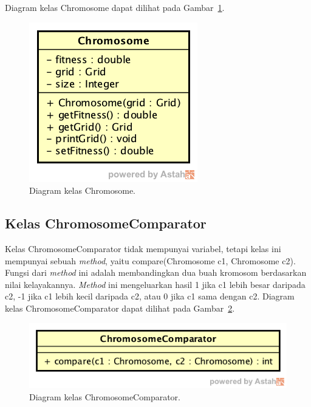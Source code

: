 Diagram kelas Chromosome dapat dilihat pada Gambar~\ref{fig:diagramkelaschromosome}.

\begin{figure}
\centering
\captionsetup{justification=centering}
\includegraphics[scale=0.5]{Gambar/Perancangan/DiagramKelasChromosome.png}
\caption[Diagram kelas Chromosome.]{Diagram kelas Chromosome.}
\label{fig:diagramkelaschromosome}
\end{figure}

\subsection{Kelas ChromosomeComparator}
\label{sec:kelaschromosomecomparator}

Kelas ChromosomeComparator tidak mempunyai variabel, tetapi kelas ini mempunyai sebuah \textit{method}, yaitu compare(Chromosome c1, Chromosome c2). Fungsi dari \textit{method} ini adalah membandingkan dua buah kromosom berdasarkan nilai kelayakannya. \textit{Method} ini mengeluarkan hasil 1 jika c1 lebih besar daripada c2, -1 jika c1 lebih kecil daripada c2, atau 0 jika c1 sama dengan c2. Diagram kelas ChromosomeComparator dapat dilihat pada Gambar~\ref{fig:diagramkelaschromosomecomparator}.

\begin{figure}
\centering
\captionsetup{justification=centering}
\includegraphics[scale=0.5]{Gambar/Perancangan/DiagramKelasChromosomeComparator.png}
\caption[Diagram kelas ChromosomeComparator.]{Diagram kelas ChromosomeComparator.}
\label{fig:diagramkelaschromosomecomparator}
\end{figure}


